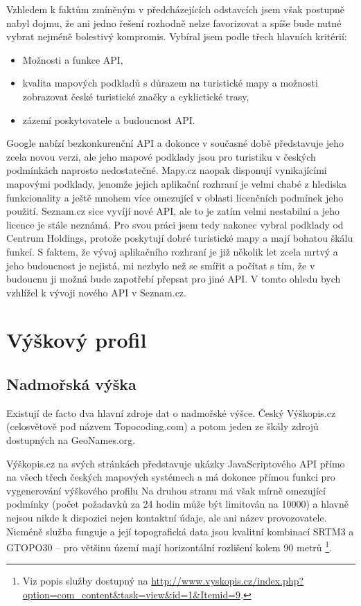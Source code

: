 Vzhledem k faktům zmíněným v předcházejících odstavcích jsem však
postupně nabyl dojmu, že ani jedno řešení rozhodně nelze favorizovat a
spíše bude nutné vybrat nejméně bolestivý kompromis. Vybíral jsem
podle třech hlavních kritérií:
\begin{itemize}
	\item Možnosti a funkce API,
	\item kvalita mapových podkladů s důrazem na turistické
	mapy a možnosti zobrazovat české turistické značky a cyklictické
	trasy,
	\item zázemí poskytovatele a budoucnost API.
\end{itemize}

Google nabízí bezkonkurenční API a dokonce v současné době
představuje jeho zcela novou verzi, ale jeho mapové podklady jsou pro turistiku v
českých podmínkách naprosto nedostatečné. Mapy.cz naopak disponují
vynikajícími mapovými podklady, jenomže jejich aplikační rozhraní je
velmi chabé z hlediska funkcionality a ještě mnohem více omezující v
oblasti licenčních podmínek jeho použití. Seznam.cz sice vyvíjí nové
API, ale to je zatím velmi nestabilní a jeho licence je stále
neznámá. Pro svou práci jsem tedy nakonec vybral podklady od Centrum
Holdings, protože poskytují dobré turistické mapy a mají bohatou
škálu funkcí. S faktem, že vývoj aplikačního rozhraní je již několik
let zcela mrtvý a jeho budoucnost je nejistá, mi nezbylo než se
smířit a počítat s tím, že v budoucnu ji možná bude zapotřebí přepsat
pro jiné API. V tomto ohledu bych vzhlížel k vývoji nového API v Seznam.cz.

\section{Výškový profil}\label{vyskovyProfil}
\subsection{Nadmořská výška}\label{vyskopis}
Existují de facto dva hlavní zdroje dat o nadmořské výšce.
Český Výškopis.cz (celosvětově pod názvem Topocoding.com) a potom
jeden ze škály zdrojů dostupných na GeoNames.org.

Výškopis.cz na svých stránkách představuje ukázky JavaScriptového API
přímo na všech třech českých mapových systémech a má dokonce přímou funkci pro
vygenerování výškového profilu Na druhou stranu má však mírně
omezující podmínky (počet požadavků za 24 hodin může být
limitován na 10000) a hlavně nejsou nikde k dispozici nejen kontaktní
údaje, ale ani název provozovatele. Nicméně služba funguje a
její topografická data jsou kvalitní kombinací SRTM3 a GTOPO30 -- pro
většinu území mají horizontální rozlišení kolem 90 metrů
\footnote{Viz popis služby dostupný na
\url{http://www.vyskopis.cz/index.php?option=com_content&task=view&id=1&Itemid=9}.}.

